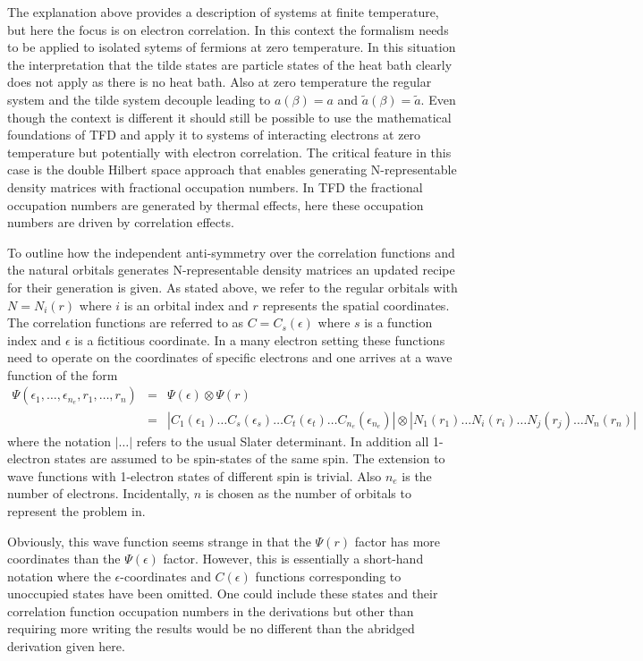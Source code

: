 \documentclass[pra,nofootinbib]{revtex4-1}
\newcommand{\nel}{{n_{e}}}
\begin{document}
The explanation above provides a description of systems at finite temperature, but here
the focus is on electron correlation. In this context the formalism needs to be applied to
isolated sytems of fermions at zero temperature. In this situation the interpretation
that the tilde states are particle states of the heat bath clearly does not apply as
there is no heat bath. Also at zero temperature the regular system and the tilde system
decouple leading to $a(\beta) = a$ and $\tilde{a}(\beta) = \tilde{a}$. Even though
the context is different it should still be possible to use the mathematical foundations 
of TFD and apply it to systems of interacting electrons at zero temperature but potentially
with electron correlation. The critical feature in this case is the double Hilbert
space approach that enables generating N-representable density matrices
with fractional occupation numbers. In TFD the fractional occupation numbers are generated
by thermal effects, here these occupation numbers are driven by correlation effects.

To outline how the independent anti-symmetry over the correlation functions and the
natural orbitals generates N-representable density matrices an updated recipe for 
their generation is given.
As stated above, we refer to the regular orbitals with $N=N_i(r)$ where $i$ is an 
orbital index and $r$ represents the spatial coordinates. The correlation functions
are referred to as $C=C_s(\epsilon)$ where $s$ is a function index and $\epsilon$ is
a fictitious coordinate. In a many electron setting these functions need to operate
on the coordinates of specific electrons and one arrives at a wave function of the form
\begin{eqnarray}
   \Psi(\epsilon_1,\ldots,\epsilon_\nel,r_1,\ldots,r_n)
   &=& \Psi(\epsilon)\otimes\Psi(r) \\
   &=& |C_1(\epsilon_1)\ldots C_s(\epsilon_s)\ldots C_t(\epsilon_t)\ldots C_\nel(\epsilon_\nel)|
   \otimes |N_1(r_1)\ldots N_i(r_i)\ldots N_j(r_j)\ldots N_n(r_n)|
   \label{Eq:Psi}
\end{eqnarray}
where the notation $|\ldots|$ refers to the usual Slater determinant. In addition all 
1-electron states are assumed to be spin-states of the same spin. The extension to
wave functions with 1-electron states of different spin is trivial.
Also $\nel$ is the number of electrons.
Incidentally, $n$ is chosen as the number of orbitals to represent the problem in.

Obviously, this wave function seems strange in that the $\Psi(r)$ factor has more 
coordinates than the $\Psi(\epsilon)$ factor. However, this is essentially a short-hand
notation where the $\epsilon$-coordinates and $C(\epsilon)$ functions corresponding to
unoccupied states have been omitted. One could include these states and their 
correlation function occupation numbers in the derivations but other than requiring
more writing the results would be no different than the abridged derivation given here.
\end{document}
